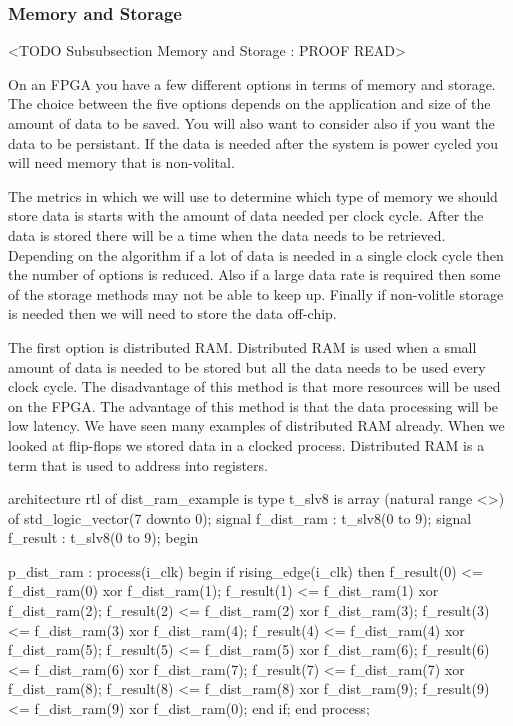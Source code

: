 	
\subsubsection{Memory and Storage}
	<TODO Subsubsection  Memory and Storage : PROOF READ>

On an \ac{FPGA} you have a few different options in terms of memory and storage. The choice between the five options depends on the application and size of the amount of data to be saved. You will also want to consider also if you want the data to be persistant. If the data is needed after the system is power cycled you will need memory that is non-volital. 

The metrics in which we will use to determine which type of memory we should store data is starts with the amount of data needed per clock cycle. After the data is stored there will be a time when the data needs to be retrieved. Depending on the algorithm if a lot of data is needed in a single clock cycle then the number of options is reduced. Also if a large data rate is required then some of the storage methods may not be able to keep up. Finally if non-volitle storage is needed then we will need to store the data off-chip. 

The first option is distributed \ac{RAM}. Distributed \ac{RAM} is used when a small amount of data is needed to be stored but all the data needs to be used every clock cycle. The disadvantage of this method is that more resources will be used on the \ac{FPGA}. The advantage of this method is that the data processing will be low latency. We have seen many examples of distributed \ac{RAM} already. When we looked at flip-flops we stored data in a clocked process. Distributed \ac{RAM} is a term that is used to address into registers. 

\begin{VHDLlisting}[tabsize=8]
architecture rtl of dist_ram_example is
	type t_slv8 is array (natural range <>) of std_logic_vector(7 downto 0);
	signal f_dist_ram : t_slv8(0 to 9);
	signal f_result   : t_slv8(0 to 9);
begin

p_dist_ram : process(i_clk)
begin
	if rising_edge(i_clk) then
		f_result(0) <= f_dist_ram(0) xor f_dist_ram(1);
		f_result(1) <= f_dist_ram(1) xor f_dist_ram(2);
		f_result(2) <= f_dist_ram(2) xor f_dist_ram(3);
		f_result(3) <= f_dist_ram(3) xor f_dist_ram(4);
		f_result(4) <= f_dist_ram(4) xor f_dist_ram(5);
		f_result(5) <= f_dist_ram(5) xor f_dist_ram(6);
		f_result(6) <= f_dist_ram(6) xor f_dist_ram(7);
		f_result(7) <= f_dist_ram(7) xor f_dist_ram(8);
		f_result(8) <= f_dist_ram(8) xor f_dist_ram(9);
		f_result(9) <= f_dist_ram(9) xor f_dist_ram(0);
	end if;
end process;
\end{VHDLlisting}

